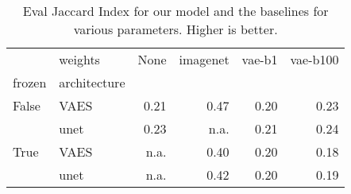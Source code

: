 \begin{table}[ht]
\centering
\caption{Eval Jaccard Index for our model and the baselines for various parameters. Higher is better.}
\label{tab:baseline_results}
\begin{tabular}{llrrrr}
\toprule
     & weights &  None &  imagenet &  vae-b1 &  vae-b100 \\
frozen & architecture &       &           &         &           \\
\midrule
False & VAES &  0.21 &      0.47 &    0.20 &      0.23 \\
     & unet &  0.23 &      n.a. &    0.21 &      0.24 \\
True & VAES &  n.a. &      0.40 &    0.20 &      0.18 \\
     & unet &  n.a. &      0.42 &    0.20 &      0.19 \\
\bottomrule
\end{tabular}
\end{table}
